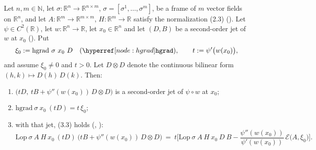 \begin{lemma}[Lemma~3.1]
Let $n,m\in\mathbb N$, let $\sigma:\mathbb R^{n}\to\mathbb R^{n\times m}$,
$\sigma=[\sigma^1,\ldots,\sigma^m]$, be a frame of $m$ vector fields on $\mathbb R^{n}$,
and let $A:\mathbb R^{m}\to\mathbb R^{m\times m}$, $H:\mathbb R^{m}\to\mathbb R$ satisfy
the normalization (2.3) (). Let $\psi\in C^{2}(\mathbb R)$, let
$w:\mathbb R^{n}\to\mathbb R$, let $x_0\in\mathbb R^{n}$ and let $(D,B)$ be a second-order
jet of $w$ at $x_0$ (). Put
\[
 \xi_0:=\mathrm{hgrad}\ \sigma\ x_0\ D\quad(\noderef{hgrad}),\qquad
 t:=\psi'\big(w(x_0)\big),
\]
and assume $\xi_0\ne0$ and $t>0$. Let $D\otimes D$ denote the continuous bilinear form
$(h,k)\mapsto D(h)\,D(k)$. Then:
\begin{enumerate}
\item $\big(tD,\ tB+\psi''(w(x_0))\,D\otimes D\big)$ is a second-order jet of $\psi\circ w$
  at $x_0$;
\item $\mathrm{hgrad}\ \sigma\ x_0\ (tD)=t\,\xi_0$;
\item with that jet, (3.3) holds (, ):
\[
 \mathrm{Lop}\ \sigma\ A\ H\ x_0\ (tD)\ \big(tB+\psi''(w(x_0))\,D\otimes D\big)
 \ =\ t\Big[\mathrm{Lop}\ \sigma\ A\ H\ x_0\ D\ B
 -\frac{\psi''(w(x_0))}{\psi'(w(x_0))}\,\mathcal E\big(A,\xi_0\big)\Big].
\]
\end{enumerate}
\end{lemma}
